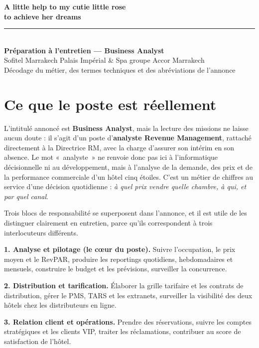 \documentclass[11pt,a4paper]{article}
\newcommand{\terme}[1]{\textcolor{bleusof}{\textbf{#1}}}
\begin{document}
\begin{center}
{\LARGE\bfseries\color{bleusof} A little help to my cutie little rose\\[2pt] to achieve her dreams}\\[10pt]
{\color{orsof}\rule{0.55\textwidth}{1.2pt}}\\[5pt]
{\large\bfseries Préparation à l'entretien --- Business Analyst}\\[3pt]
{\normalsize Sofitel Marrakech Palais Impérial \& Spa \textbullet{} groupe Accor \textbullet{} Marrakech}\\[2pt]
{\footnotesize\color{grisfonce} Décodage du métier, des termes techniques et des abréviations de l'annonce}
\end{center}

\vspace{-0.3em}

\section{Ce que le poste est réellement}

L'intitulé annoncé est \terme{Business Analyst}, mais la lecture des missions ne laisse aucun doute : il s'agit d'un poste d'\terme{analyste Revenue Management}, rattaché directement à la Directrice RM, avec la charge d'assurer son intérim en son absence. Le mot «~analyste~» ne renvoie donc pas ici à l'informatique décisionnelle ni au développement, mais à l'analyse de la demande, des prix et de la performance commerciale d'un hôtel cinq étoiles. C'est un métier de chiffres au service d'une décision quotidienne : \emph{à quel prix vendre quelle chambre, à qui, et par quel canal}.

Trois blocs de responsabilité se superposent dans l'annonce, et il est utile de les distinguer clairement en entretien, parce qu'ils correspondent à trois interlocuteurs différents.

\begin{tcolorbox}[colback=grisdoux,colframe=bleusof,boxrule=0.7pt,arc=2pt,left=6pt,right=6pt,top=5pt,bottom=5pt]
\terme{1. Analyse et pilotage (le c\oe ur du poste).} Suivre l'occupation, le prix moyen et le RevPAR, produire les reportings quotidiens, hebdomadaires et mensuels, construire le budget et les prévisions, surveiller la concurrence.

\terme{2. Distribution et tarification.} Élaborer la grille tarifaire et les contrats de distribution, gérer le PMS, TARS et les extranets, surveiller la visibilité des deux hôtels chez les distributeurs en ligne.

\terme{3. Relation client et opérations.} Prendre des réservations, suivre les comptes stratégiques et les clients VIP, traiter les réclamations, contribuer au score de satisfaction de l'hôtel.
\end{tcolorbox}
\end{document}
